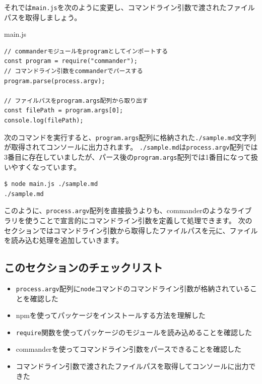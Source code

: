 それでは\texttt{main.js}を次のように変更し、コマンドライン引数で渡されたファイルパスを取得しましょう。

\begin{listtitle}
main.js
\end{listtitle}
\begin{lstlisting}
// commanderモジュールをprogramとしてインポートする
const program = require("commander");
// コマンドライン引数をcommanderでパースする
program.parse(process.argv);

// ファイルパスをprogram.args配列から取り出す
const filePath = program.args[0];
console.log(filePath);
\end{lstlisting}
\listend

次のコマンドを実行すると、\texttt{program.args}配列に格納された\texttt{./sample.md}文字列が取得されてコンソールに出力されます。
\texttt{./sample.md}は\texttt{process.argv}配列では3番目に存在していましたが、パース後の\texttt{program.args}配列では1番目になって扱いやすくなっています。

\begin{lstlisting}
$ node main.js ./sample.md
./sample.md
\end{lstlisting}

このように、\texttt{process.argv}配列を直接扱うよりも、commanderのようなライブラリを使うことで宣言的にコマンドライン引数を定義して処理できます。
次のセクションではコマンドライン引数から取得したファイルパスを元に、ファイルを読み込む処理を追加していきます。

\hypertarget{section-checklist}{%
\subsection{このセクションのチェックリスト}\label{section-checklist}}

\begin{itemize}
\item
  \texttt{process.argv}配列に\texttt{node}コマンドのコマンドライン引数が格納されていることを確認した
\item
  npmを使ってパッケージをインストールする方法を理解した
\item
  \texttt{require}関数を使ってパッケージのモジュールを読み込めることを確認した
\item
  commanderを使ってコマンドライン引数をパースできることを確認した
\item
  コマンドライン引数で渡されたファイルパスを取得してコンソールに出力できた
\end{itemize}

